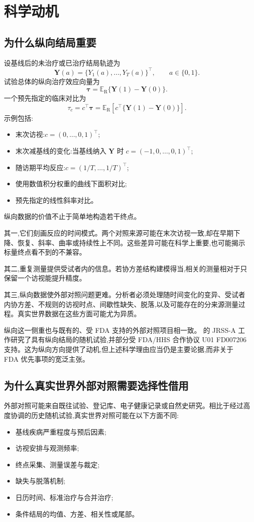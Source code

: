 \documentclass[11pt]{article}
\newcommand{\R}{\mathrm{R}}
\newcommand{\Exp}{\mathbb{E}}
\begin{document}
\section{科学动机}

\subsection{为什么纵向结局重要}

设基线后的未治疗或已治疗结局轨迹为
\[
\bm Y(a)=\{Y_1(a),\ldots,Y_T(a)\}^{\top}, \qquad a\in\{0,1\}.
\]
试验总体的纵向治疗效应向量为
\[
\bm\tau=\Exp_{\R}\{\bm Y(1)-\bm Y(0)\}.
\]
一个预先指定的临床对比为
\[
\tau_c=c^{\top}\bm\tau
=\Exp_{\R}\!\left[c^{\top}\{\bm Y(1)-\bm Y(0)\}\right].
\]
示例包括:
\begin{itemize}
    \item 末次访视:$c=(0,\ldots,0,1)^{\top}$;
    \item 末次减基线的变化:当基线纳入 $\bm Y$ 时 $c=(-1,0,\ldots,0,1)^{\top}$;
    \item 随访期平均反应:$c=(1/T,\ldots,1/T)^{\top}$;
    \item 使用数值积分权重的曲线下面积对比;
    \item 预先指定的线性斜率对比。
\end{itemize}

纵向数据的价值不止于简单地构造若干终点。

其一,它们刻画反应的时间模式。两个对照来源可能在末次访视一致,却在早期下降、恢复、斜率、曲率或持续性上不同。这些差异可能在科学上重要,也可能揭示标量终点看不到的不兼容。

其二,重复测量提供受试者内的信息。若协方差结构建模得当,相关的测量相对于只保留一个访视能提升精度。

其三,纵向数据使外部对照问题更难。分析者必须处理随时间变化的变异、受试者内协方差、不规则的访视时点、间歇性缺失、脱落,以及可能存在的分来源测量过程。真实世界数据在这些方面可能尤为异质。

纵向这一侧重也与既有的、受 FDA 支持的外部对照项目相一致。\citet{zhou2025causal} 的 JRSS-A 工作研究了具有纵向结局的随机试验,并部分受 FDA/HHS 合作协议 U01 FD007206 支持。这为纵向方向提供了动机,但上述科学理由应当仍是主要论据,而非关于 FDA 优先事项的宽泛主张。

\subsection{为什么真实世界外部对照需要选择性借用}

外部对照可能来自既往试验、登记库、电子健康记录或自然史研究。相比于经过高度协调的历史随机试验,真实世界对照可能在以下方面不同:
\begin{itemize}
    \item 基线疾病严重程度与预后因素;
    \item 访视安排与观测频率;
    \item 终点采集、测量误差与裁定;
    \item 缺失与脱落机制;
    \item 日历时间、标准治疗与合并治疗;
    \item 条件结局的均值、方差、相关性或尾部。
\end{itemize}
\end{document}
